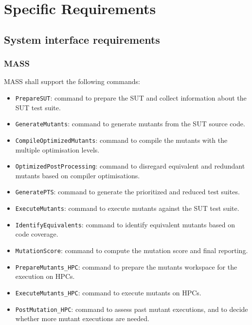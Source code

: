 
\chapter{Specific Requirements}

\section{System interface requirements}

\subsection{MASS}
\RQ{} MASS shall support the following commands:
	\begin{itemize}
	\item \texttt{PrepareSUT}: command to prepare the SUT and collect information about the SUT test suite.
	\item \texttt{GenerateMutants}: command to generate mutants from the SUT source code.
	\item \texttt{CompileOptimizedMutants}: command to compile the mutants with the multiple optimisation levels.
	\item \texttt{OptimizedPostProcessing}: command to disregard equivalent and redundant mutants based on compiler optimisations.
	\item \texttt{GeneratePTS}: command to generate the prioritized and reduced test suites.
	\item \texttt{ExecuteMutants}: command to execute mutants against the SUT test suite.
	\item \texttt{IdentifyEquivalents}: command to identify equivalent mutants based on code coverage.
	\item \texttt{MutationScore}: command to compute the mutation score and final reporting.
	\item \texttt{PrepareMutants\_HPC}: command to prepare the mutants workspace for the execution on HPCs.
	\item \texttt{ExecuteMutants\_HPC}: command to execute mutants on HPCs.
	\item \texttt{PostMutation\_HPC}: command to assess past mutant executions, and to decide whether more mutant executions are needed.
\end{itemize}

